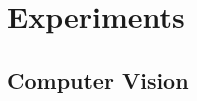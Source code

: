 \documentclass[letterpaper]{article} %
\begin{document}



\section{Experiments}
\label{sec:experiments}






\subsection{Computer Vision}
\label{sec:cv}
\end{document}
